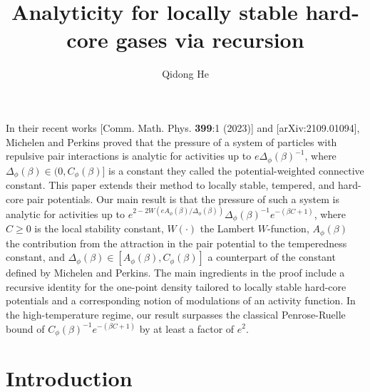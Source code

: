 \documentclass[11pt]{article}
\numberwithin{equation}{section}
\theoremstyle{plain}
\theoremstyle{definition}
\theoremstyle{remark}
\begin{document}
\title{Analyticity for locally stable hard-core gases via recursion}
\author{Qidong He}
\date{}

\maketitle

\abstract

In their recent works [Comm. Math. Phys. \textbf{399}:1 (2023)] and [arXiv:2109.01094], Michelen and Perkins proved that the pressure of a system of particles with repulsive pair interactions is analytic for activities up to $e\Delta_{\phi}(\beta)^{-1}$, where $\Delta_{\phi}(\beta)\in(0,C_{\phi}(\beta)]$ is a constant they called the potential-weighted connective constant. This paper extends their method to locally stable, tempered, and hard-core pair potentials. Our main result is that the pressure of such a system is analytic for activities up to $e^{2-2W(eA_{\phi}(\beta)/\Delta_{\phi}(\beta))}\Delta_{\phi}(\beta)^{-1}e^{-(\beta C+1)}$, where $C\ge0$ is the local stability constant, $W(\cdot)$ the Lambert $W$-function, $A_{\phi}(\beta)$ the contribution from the attraction in the pair potential to the temperedness constant, and $\Delta_{\phi}(\beta)\in[A_{\phi}(\beta),C_{\phi}(\beta)]$ a counterpart of the constant defined by Michelen and Perkins. The main ingredients in the proof include a recursive identity for the one-point density tailored to locally stable hard-core potentials and a corresponding notion of modulations of an activity function. In the high-temperature regime, our result surpasses the classical Penrose-Ruelle bound of $C_{\phi}(\beta)^{-1}e^{-(\beta C+1)}$ by at least a factor of $e^{2}$.

\tableofcontents

\section{Introduction}
\end{document}
